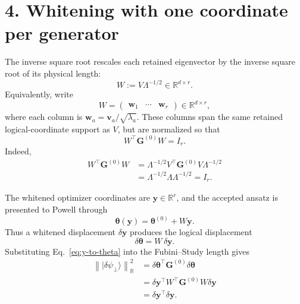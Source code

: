 \documentclass[11pt]{article}
\newcommand{\ket}[1]{\lvert #1\rangle}
\newcommand{\R}{\mathbb R}
\begin{document}
\section*{4. Whitening with one coordinate per generator}

The inverse square root rescales each retained eigenvector by the inverse
square root of its physical length:
\begin{equation}
\boxed{
W:=V\Lambda^{-1/2}
\in\R^{d\times r}.
}
\label{eq:single-coordinate-W}
\end{equation}
Equivalently, write
\begin{equation}
W
=
\begin{pmatrix}
\mathbf w_1&\cdots&\mathbf w_r
\end{pmatrix}
\in\R^{d\times r},
\label{eq:W-columns}
\end{equation}
where each column is
\(\mathbf w_a=\mathbf v_a/\sqrt{\lambda_a}\).  These columns span the same
retained logical-coordinate support as \(V\), but are normalized so that
\begin{equation}
\boxed{
W^\top\mathbf G^{(0)}W=I_r.
}
\label{eq:logical-whitening}
\end{equation}
Indeed,
\begin{align}
W^\top\mathbf G^{(0)}W
&=
\Lambda^{-1/2}V^\top
\mathbf G^{(0)}
V\Lambda^{-1/2}\nonumber\\
&=
\Lambda^{-1/2}\Lambda\Lambda^{-1/2}
=I_r.
\label{eq:single-coordinate-whitening-proof}
\end{align}

The whitened optimizer coordinates are
\(\mathbf y\in\R^r\), and the accepted ansatz is presented to Powell through
\begin{equation}
\boxed{
\boldsymbol\theta(\mathbf y)
=
\boldsymbol\theta^{(0)}
+W\mathbf y.
}
\label{eq:powell-chart}
\end{equation}
Thus a whitened displacement
\(\delta\mathbf y\) produces the logical displacement
\begin{equation}
\delta\boldsymbol\theta=W\,\delta\mathbf y.
\label{eq:y-to-theta}
\end{equation}
Substituting Eq.~\eqref{eq:y-to-theta} into the Fubini--Study length gives
\begin{align}
\left\|\ket{\delta\psi_\perp}\right\|_{\R}^{2}
&=
\delta\boldsymbol\theta^\top
\mathbf G^{(0)}
\delta\boldsymbol\theta\nonumber\\
&=
\delta\mathbf y^\top
W^\top\mathbf G^{(0)}W
\delta\mathbf y\nonumber\\
&=
\delta\mathbf y^\top\delta\mathbf y.
\label{eq:whitened-fs-length}
\end{align}
\end{document}
